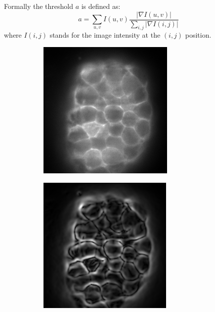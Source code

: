 \documentclass[
  digital,     %
  oneside,     %
  nosansbold,  %
  nocolorbold, %
  lof,         %
  lot,         %
]{fithesis4}
\begin{document}
Formally the threshold $a$ is defined as:
$$a = \sum_{u, v} I(u, v) \frac{|\nabla I(u, v)|}{\sum_{i, j} |\nabla I(i,j)|}$$
where $I(i, j)$ stands for the image intensity at the $(i, j)$ position.

\begin{figure}
    \begin{subfigure}{0.3\linewidth}
        \centering
        \includegraphics[width=\textwidth]{./resources/grad-thresh-orig.png}
        \caption{}
        \label{fig:grad-thresh-orig}
    \end{subfigure}
    \begin{subfigure}{0.3\linewidth}
        \centering
        \includegraphics[width=\textwidth]{./resources/grad-thresh-grad.png}

\end{subfigure}
\end{figure}
\end{document}
